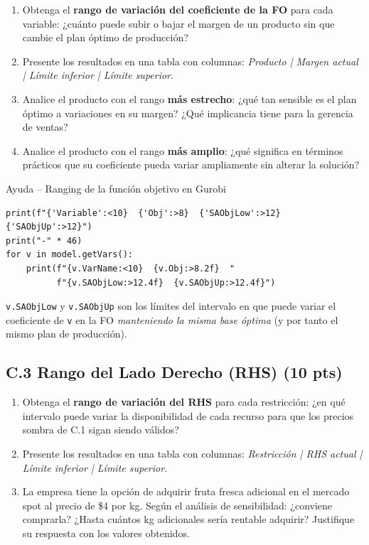 \documentclass[12pt,a4paper]{article}
\begin{document}
\begin{enumerate}[label=\alph*), leftmargin=*, topsep=2pt]
    \item Obtenga el \textbf{rango de variación del coeficiente de la FO}
          para cada variable: ¿cuánto puede subir o bajar el margen de
          un producto sin que cambie el plan óptimo de producción?
    \item Presente los resultados en una tabla con columnas:
          \emph{Producto | Margen actual | Límite inferior | Límite superior}.
    \item Analice el producto con el rango \textbf{más estrecho}:
          ¿qué tan sensible es el plan óptimo a variaciones en su margen?
          ¿Qué implicancia tiene para la gerencia de ventas?
    \item Analice el producto con el rango \textbf{más amplio}:
          ¿qué significa en términos prácticos que su coeficiente pueda
          variar ampliamente sin alterar la solución?
\end{enumerate}

\begin{ayuda}{Ayuda -- Ranging de la función objetivo en Gurobi}
\begin{lstlisting}
print(f"{'Variable':<10}  {'Obj':>8}  {'SAObjLow':>12}  {'SAObjUp':>12}")
print("-" * 46)
for v in model.getVars():
    print(f"{v.VarName:<10}  {v.Obj:>8.2f}  "
          f"{v.SAObjLow:>12.4f}  {v.SAObjUp:>12.4f}")
\end{lstlisting}
\texttt{v.SAObjLow} y \texttt{v.SAObjUp} son los límites del intervalo en
que puede variar el coeficiente de \texttt{v} en la FO \emph{manteniendo
la misma base óptima} (y por tanto el mismo plan de producción).
\end{ayuda}

\vspace{0.5em}
\newpage
\subsection*{C.3 \quad Rango del Lado Derecho (RHS) \hfill\normalfont\normalsize(10 pts)}

\begin{enumerate}[label=\alph*), leftmargin=*, topsep=2pt]
    \item Obtenga el \textbf{rango de variación del RHS} para cada
          restricción: ¿en qué intervalo puede variar la disponibilidad
          de cada recurso para que los precios sombra de C.1 sigan siendo
          válidos?
    \item Presente los resultados en una tabla con columnas:
          \emph{Restricción | RHS actual | Límite inferior | Límite superior}.
    \item La empresa tiene la opción de adquirir fruta fresca adicional en
          el mercado spot al precio de \$4 por kg. Según el análisis de
          sensibilidad: ¿conviene comprarla? ¿Hasta cuántos kg adicionales
          sería rentable adquirir? Justifique su respuesta con los valores
          obtenidos.
\end{enumerate}
\end{document}
